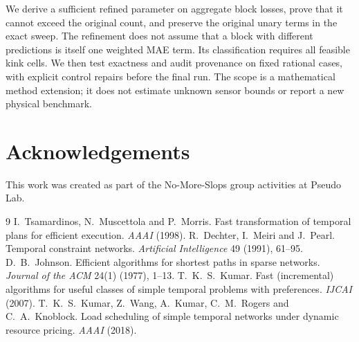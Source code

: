 \documentclass[10pt,a4paper]{article}
\begin{document}
We derive a sufficient refined parameter on aggregate block losses, prove
that it cannot exceed the original count, and preserve the original unary
terms in the exact sweep. The refinement does not assume that a block with
different predictions is itself one weighted MAE term. Its classification
requires all feasible kink cells. We then test exactness and audit provenance
on fixed rational cases, with explicit control repairs before the final run.
The scope is a mathematical method extension; it does not estimate unknown
sensor bounds or report a new physical benchmark.


\section*{Acknowledgements}
This work was created as part of the No-More-Slops group activities at Pseudo Lab.

\begin{thebibliography}{9}
 I.~Tsamardinos, N.~Muscettola and P.~Morris.
Fast transformation of temporal plans for efficient execution. \emph{AAAI} (1998).
 R.~Dechter, I.~Meiri and J.~Pearl.
Temporal constraint networks. \emph{Artificial Intelligence} 49 (1991), 61--95.
 D.~B.~Johnson. Efficient algorithms for shortest paths
in sparse networks. \emph{Journal of the ACM} 24(1) (1977), 1--13.
 T.~K.~S.~Kumar. Fast (incremental) algorithms for useful
classes of simple temporal problems with preferences. \emph{IJCAI} (2007).
 T.~K.~S.~Kumar, Z.~Wang, A.~Kumar, C.~M.~Rogers and C.~A.~Knoblock.
Load scheduling of simple temporal networks under dynamic resource pricing.
\emph{AAAI} (2018).
\end{thebibliography}
\end{document}
